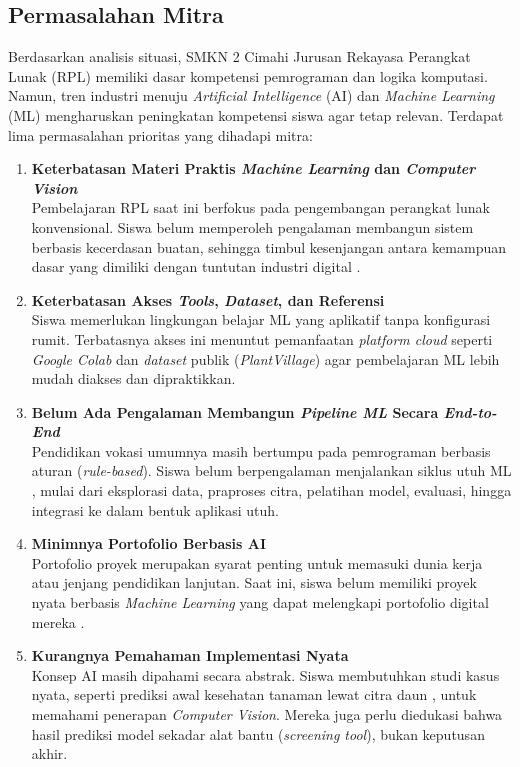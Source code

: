\subsection{Permasalahan Mitra}

Berdasarkan analisis situasi, SMKN 2 Cimahi Jurusan Rekayasa Perangkat Lunak (RPL) memiliki dasar kompetensi pemrograman dan logika komputasi. Namun, tren industri menuju \textit{Artificial Intelligence} (AI) dan \textit{Machine Learning} (ML) mengharuskan peningkatan kompetensi siswa agar tetap relevan. Terdapat lima permasalahan prioritas yang dihadapi mitra:

\begin{enumerate}
    \item \textbf{Keterbatasan Materi Praktis \textit{Machine Learning} dan \textit{Computer Vision}}\\
    Pembelajaran RPL saat ini berfokus pada pengembangan perangkat lunak konvensional. Siswa belum memperoleh pengalaman membangun sistem berbasis kecerdasan buatan, sehingga timbul kesenjangan antara kemampuan dasar yang dimiliki dengan tuntutan industri digital \parencite{Utomo2024, Hidayat2026}.

    \item \textbf{Keterbatasan Akses \textit{Tools}, \textit{Dataset}, dan Referensi}\\
    Siswa memerlukan lingkungan belajar ML yang aplikatif tanpa konfigurasi rumit. Terbatasnya akses ini menuntut pemanfaatan \textit{platform cloud} seperti \textit{Google Colab} \parencite{Handayani2025, Nugrahanti2025} dan \textit{dataset} publik (\textit{PlantVillage}) agar pembelajaran ML lebih mudah diakses dan dipraktikkan.

    \item \textbf{Belum Ada Pengalaman Membangun \textit{Pipeline ML} Secara \textit{End-to-End}}\\
    Pendidikan vokasi umumnya masih bertumpu pada pemrograman berbasis aturan (\textit{rule-based}). Siswa belum berpengalaman menjalankan siklus utuh ML \parencite{Wibowo2026}, mulai dari eksplorasi data, praproses citra, pelatihan model, evaluasi, hingga integrasi ke dalam bentuk aplikasi utuh.

    \item \textbf{Minimnya Portofolio Berbasis AI}\\
    Portofolio proyek merupakan syarat penting untuk memasuki dunia kerja atau jenjang pendidikan lanjutan. Saat ini, siswa belum memiliki proyek nyata berbasis \textit{Machine Learning} yang dapat melengkapi portofolio digital mereka \parencite{Ali2025, Panjaitan2025}.

    \item \textbf{Kurangnya Pemahaman Implementasi Nyata}\\
    Konsep AI masih dipahami secara abstrak. Siswa membutuhkan studi kasus nyata, seperti prediksi awal kesehatan tanaman lewat citra daun \parencite{Imanulloh2023, MarwanRamdhanyEdy2025}, untuk memahami penerapan \textit{Computer Vision}. Mereka juga perlu diedukasi bahwa hasil prediksi model sekadar alat bantu (\textit{screening tool}), bukan keputusan akhir.
\end{enumerate}

